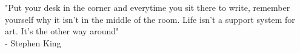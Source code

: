 \dedicatory

"Put your desk in the corner and everytime you sit there to write, remember yourself why it isn't in the middle of the room. Life isn't a support system for art. It's the other way around" \\
- Stephen King

\enddedicatory